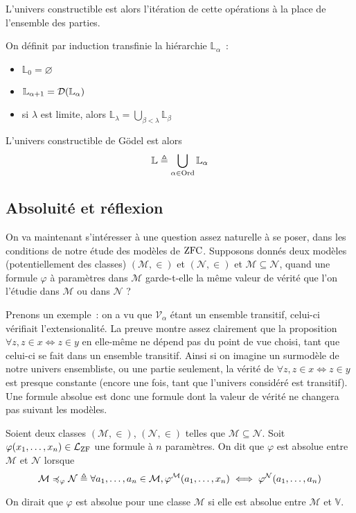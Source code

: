 L'univers constructible est alors l'itération de cette opérations à la place de
l'ensemble des parties.

\begin{definition}\label{def.L}
  On définit par induction transfinie la hiérarchie $\mathbb L_\alpha$~:
  \begin{itemize}
  \item $\mathbb L_0 = \varnothing$
  \item $\mathbb L_{\alpha + 1} = \mathcal{D} (\mathbb L_\alpha)$
  \item si $\lambda$ est limite, alors
    $\displaystyle\mathbb L_\lambda = \bigcup_{\beta < \lambda} \mathbb L_\beta$
  \end{itemize}
  L'univers constructible de Gödel est alors
  \[\mathbb L \triangleq \bigcup_{\alpha \in \operatorname{Ord}} \mathbb L_\alpha\]
\end{definition}

\subsection{Absoluité et réflexion}

On va maintenant s'intéresser à une question assez naturelle à se poser, dans
les conditions de notre étude des modèles de $\operatorname{ZFC}$. Supposons donnés deux
modèles (potentiellement des classes) $(\mathcal M,\in)$ et $(\mathcal N,\in)$
et $\mathcal M \subseteq \mathcal N$, quand une formule $\varphi$ à paramètres
dans $\mathcal M$ garde-t-elle la même valeur de vérité que l'on l'étudie dans
$\mathcal M$ ou dans $\mathcal N$ ?

Prenons un exemple~: on a vu que $\mathcal V_\alpha$ étant un ensemble
transitif, celui-ci vérifiait l'extensionalité. La preuve montre assez
clairement que la proposition $\forall z, z \in x \iff z \in y$ en elle-même
ne dépend pas du point de vue choisi, tant que celui-ci se fait dans un
ensemble transitif. Ainsi si on imagine un surmodèle de notre univers
ensembliste, ou une partie seulement, la vérité de
$\forall z, z \in x \iff z \in y$ est presque constante (encore une fois, tant
que l'univers considéré est transitif). Une formule absolue est donc une
formule dont la valeur de vérité ne changera pas suivant les modèles.

\begin{definition}
  Soient deux classes $(\mathcal M,\in)$, $(\mathcal N,\in)$ telles que
  $\mathcal M \subseteq \mathcal N$.
  Soit $\varphi(x_1,\ldots,x_n) \in \mathcal L_{\operatorname{ZF}}$ une formule à $n$
  paramètres. On dit que $\varphi$ est absolue entre $\mathcal M$ et
  $\mathcal N$ lorsque
  \[\mathcal M \preccurlyeq_\varphi \mathcal N \triangleq
  \forall a_1,\ldots,a_n \in \mathcal M, \varphi^{\mathcal M}(a_1,\ldots,x_n)
  \iff \varphi^{\mathcal N}(a_1,\ldots,a_n)\]

  On dirait que $\varphi$ est absolue pour une classe $\mathcal M$ si elle est
  absolue entre $\mathcal M$ et $\mathbb V$.
\end{definition}

